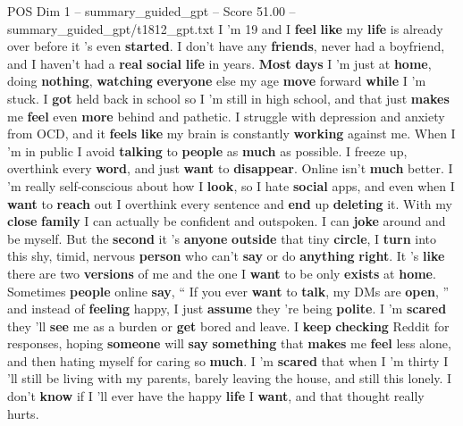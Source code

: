 \begin{textsample}{POS Dim 1 – summary\_guided\_gpt – Score 51.00 – summary\_guided\_gpt/t1812\_gpt.txt}  \label{ex:f1_pos_030}
I ’m 19 and I \textbf{feel} \textbf{like} my \textbf{life} is already over before it ’s even \textbf{started}.
I don't have any \textbf{friends}, never had a boyfriend, and I haven't had a \textbf{real} \textbf{social} \textbf{life} in years. \textbf{Most} \textbf{days} I ’m just at \textbf{home}, doing \textbf{nothing}, \textbf{watching} \textbf{everyone} else my age \textbf{move} forward \textbf{while} I ’m stuck.
I \textbf{got} held back in school so I ’m still in high school, and that just \textbf{makes} me \textbf{feel} even \textbf{more} behind and pathetic.
I struggle with depression and anxiety from OCD, and it \textbf{feels} \textbf{like} my brain is constantly \textbf{working} against me.
When I ’m in public I avoid \textbf{talking} to \textbf{people} as \textbf{much} as possible.
I freeze up, overthink every \textbf{word}, and just \textbf{want} to \textbf{disappear}.
Online isn't \textbf{much} better.
I ’m really self‑conscious about how I \textbf{look}, so I hate \textbf{social} apps, and even when I \textbf{want} to \textbf{reach} out I overthink every sentence and \textbf{end} up \textbf{deleting} it.
With my \textbf{close} \textbf{family} I can actually be confident and outspoken.
I can \textbf{joke} around and be myself.
But the \textbf{second} it ’s \textbf{anyone} \textbf{outside} that tiny \textbf{circle}, I \textbf{turn} into this shy, timid, nervous \textbf{person} who can't \textbf{say} or do \textbf{anything} \textbf{right}.
It ’s \textbf{like} there are two \textbf{versions} of me and the one I \textbf{want} to be only \textbf{exists} at \textbf{home}.
Sometimes \textbf{people} online \textbf{say}, “ If you ever \textbf{want} to \textbf{talk}, my DMs are \textbf{open}, ” and instead of \textbf{feeling} happy, I just \textbf{assume} they ’re being \textbf{polite}.
I ’m \textbf{scared} they ’ll \textbf{see} me as a burden or \textbf{get} bored and leave.
I \textbf{keep} \textbf{checking} Reddit for responses, hoping \textbf{someone} will \textbf{say} \textbf{something} that \textbf{makes} me \textbf{feel} less alone, and then hating myself for caring so \textbf{much}.
I ’m \textbf{scared} that when I ’m thirty I ’ll still be living with my parents, barely leaving the house, and still this lonely.
I don't \textbf{know} if I ’ll ever have the happy \textbf{life} I \textbf{want}, and that thought really hurts.

\end{textsample}
